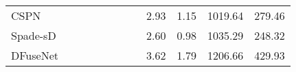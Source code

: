 \documentclass[letterpaper, 10 pt, conference]{ieeeconf}  \usepackage{geometry}
\begin{document}
\begin{table*}[t]
{\begin{tabular}{@{}lccccccccccc@{}}
			\multicolumn{1}{l|}{CSPN \cite{CSPN}}                             & \multicolumn{1}{c|}{\checkmark}                                                        & \multicolumn{1}{c|}{\checkmark}                                                              & \multicolumn{1}{c|}{}                                                            & \multicolumn{1}{c|}{}                 & \multicolumn{1}{c|}{\checkmark}              & \multicolumn{1}{c|}{}                                                                 & \multicolumn{1}{c|}{}                                                                   & 2.93                                                                                 & 1.15                                                                                & 1019.64                                                                           & 279.46                                                      \\
			\multicolumn{1}{l|}{Spade-sD \cite{Sparse_Training_Spade}}                         & \multicolumn{1}{c|}{}                                                           & \multicolumn{1}{c|}{\checkmark}                                                              & \multicolumn{1}{c|}{}                                                            & \multicolumn{1}{c|}{}                 & \multicolumn{1}{c|}{}                 & \multicolumn{1}{c|}{}                                                                 & \multicolumn{1}{c|}{}                                                                   & 2.60                                                                                 & 0.98                                                                                & 1035.29                                                                           & 248.32                                                      \\
			\multicolumn{1}{l|}{DFuseNet \cite{DFUSE}}                         & \multicolumn{1}{c|}{\checkmark}                                                        & \multicolumn{1}{c|}{\checkmark}                                                              & \multicolumn{1}{c|}{}                                                            & \multicolumn{1}{c|}{}                 & \multicolumn{1}{c|}{}                 & \multicolumn{1}{c|}{}                                                                 & \multicolumn{1}{c|}{\checkmark}                                                                & 3.62                                                                                 & 1.79                                                                                & 1206.66                                                                           & 429.93                                                      \\

\end{tabular}}
\end{table*}
\end{document}

